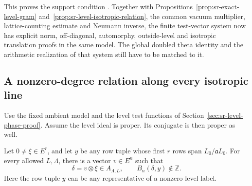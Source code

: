 This proves the support condition .
Together with
Propositions~\ref{prop:sr-exact-level-gram}
and~\ref{prop:sr-level-isotropic-relation}, the common vacuum
multiplier, lattice-counting estimate and Neumann inverse,
the finite test-vector system now has explicit norm,
off-diagonal, automorphy, outside-level and isotropic
translation proofs in the same model.
The global doubled theta identity and the arithmetic
realization of that system still have to be matched to it.

\subsection{A nonzero-degree relation along every isotropic line}
\label{subsec:sr-level-isotropic-relation}

Use the fixed ambient model and the level test functions of
Section~\ref{sec:sr-level-phase-proof}.  Assume the level ideal is
proper.  Its conjugate is then proper as well.

\begin{srlemma}\label{lem:sr-level-line-detection}
Let \(0\ne\xi\in E^r\), and let \(y\) be any row tuple whose
first \(r\) rows span \(L_0/\mathfrak aL_0\).
For every allowed \(L,\Lambda\), there is a vector \(v\in E^n\)
such that
\[
 \delta=v\otimes\xi\in A_{\Lambda,L},\qquad
                         B_n(\delta,y)\notin\mathbb Z .
\]
Here the row tuple \(y\) can be any representative of a
nonzero level label.
\end{srlemma}

